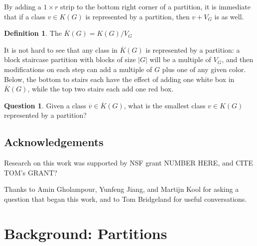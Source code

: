 \documentclass{amsart}[12pt]
\theoremstyle{definition}
\newtheorem{definition}[dummy]{Definition}
\newtheorem{question}{Question}
\begin{document}
By adding a $1\times r$ strip to the bottom right corner of a partition, it is immediate that if a class $v\in K(G)$ is represented by a partition, then $v+V_G$ is as well. 

\begin{definition}
The $\overline{K}(G)=K(G)/V_G$ 
\end{definition}

It is not hard to see that any class in $\overline{K}(G)$ is represented by a partition: a block staircase partition with blocks of size $|G|$ will be a multiple of $V_G$, and then modifications on each step can add a multiple of $G$ plus one of any given color.  Below, the bottom to stairs each have the effect of adding one white box in $\overline{K}(G)$, while the top two stairs each add one red box.



\begin{question}
Given a class $\overline{v}\in \overline{K}(G)$, what is the smallest class $v\in K(G)$ represented by a partition?
\end{question}


\subsection{Acknowledgements}

Research on this work was supported by NSF grant NUMBER HERE, and CITE TOM's GRANT?

Thanks to Amin Gholampour, Yunfeng Jiang, and Martijn Kool for asking a question that began this work, and to Tom Bridgeland for useful conversations.

\section{Background: Partitions}
\end{document}
